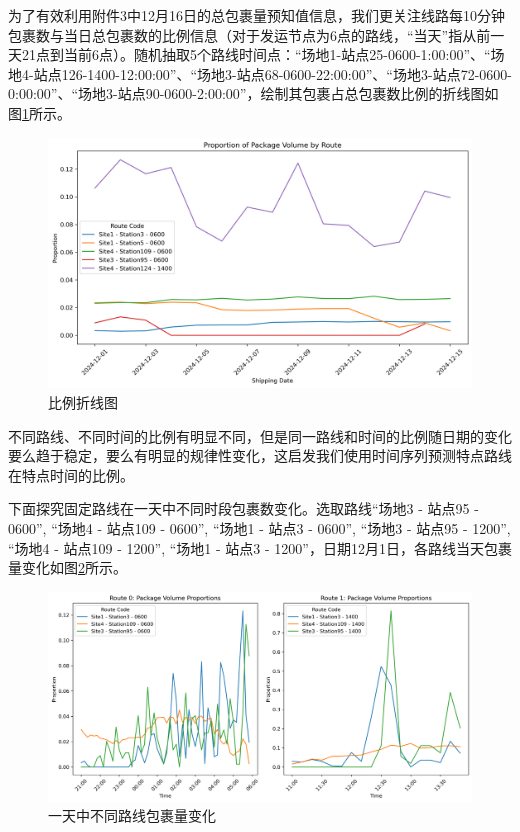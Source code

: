 \documentclass{MMCStyle}
\begin{document}
为了有效利用附件3中12月16日的总包裹量预知值信息，我们更关注线路每10分钟包裹数与当日总包裹数的比例信息（对于发运节点为6点的路线，“当天”指从前一天21点到当前6点）。随机抽取5个路线时间点：“场地1-站点25-0600-1:00:00”、“场地4-站点126-1400-12:00:00”、“场地3-站点68-0600-22:00:00”、“场地3-站点72-0600-0:00:00”、“场地3-站点90-0600-2:00:00”，绘制其包裹占总包裹数比例的折线图如图\ref{fig:4}所示。

\begin{figure}[htb]
	\centering
	\includegraphics[width=\linewidth]{比例折线图.png}
	\caption{比例折线图}
	\label{fig:4}
\end{figure}

不同路线、不同时间的比例有明显不同，但是同一路线和时间的比例随日期的变化要么趋于稳定，要么有明显的规律性变化，这启发我们使用时间序列预测特点路线在特点时间的比例。

下面探究固定路线在一天中不同时段包裹数变化。选取路线“场地3 - 站点95 - 0600”, “场地4 - 站点109 - 0600”, “场地1 - 站点3 - 0600”, “场地3 - 站点95 - 1200”, “场地4 - 站点109 - 1200”, “场地1 - 站点3 - 1200”，日期12月1日，各路线当天包裹量变化如图\ref{fig:7}所示。

\begin{figure}[htb]
	\centering
	\includegraphics[width=\linewidth]{比例折线图_时间.png}
	\caption{一天中不同路线包裹量变化}
	\label{fig:7}
\end{figure}
\end{document}
